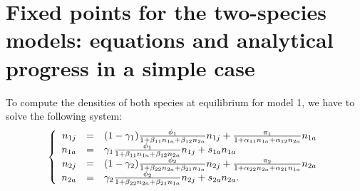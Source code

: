 \documentclass{article}
\begin{document}
\newpage

\setcounter{section}{0}
\renewcommand{\thesection}{Supplement \Alph{section}}

\setcounter{equation}{0}
\renewcommand{\theequation}{S\arabic{equation}}

\setcounter{figure}{0}
\renewcommand{\thefigure}{S\arabic{figure}}

\setcounter{table}{0}
\renewcommand{\thetable}{S\arabic{table}}


\section{Fixed points for the two-species models: equations and analytical progress in a simple case}\label{SI:fixedpoints_twospecies}

To compute the densities of both species at equilibrium for model 1, we have to solve the following system:
\begin{equation}
    \left\{
\begin{array}{r c l}
n_{1j} &=& (1-\gamma_1)\frac{\phi_1}{1+\beta_{11}n_{1a}+\beta_{12}n_{2a}}n_{1j} + \frac{\pi_1}{1+\alpha_{11}n_{1a}+\alpha_{12}n_{2a}}n_{1a}\\
n_{1a} &=& \gamma_1 \frac{\phi_1}{1+\beta_{11}n_{1a}+\beta_{12}n_{2a}}n_{1j} + s_{1a}n_{1a}\\
n_{2j} &=& (1-\gamma_2)\frac{\phi_2}{1+\beta_{22}n_{2a}+\beta_{21}n_{1a}}n_{2j} + \frac{\pi_2}{1+\alpha_{22}n_{2a}+\alpha_{21}n_{1a}}n_{2a}\\
n_{2a} &=& \gamma_2 \frac{\phi_2}{1+\beta_{22}n_{2a}+\beta_{21}n_{1a}}n_{2j} + s_{2a}n_{2a}.
\end{array}
\right.
\end{equation}
\end{document}
